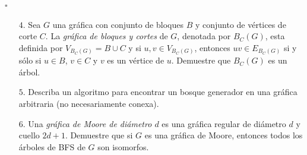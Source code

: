 \documentclass{article}
\begin{document}
\hfill $\square$
\begin{enumerate}
\item[$4$.] Sea $G$ una gr\'afica con conjunto de bloques $B$ y conjunto de
  v\'ertices de corte $C$.   La {\em gr\'afica de bloques y cortes} de $G$,
  denotada por $B_C (G)$, esta definida por $V_{B_C (G)} = B \cup C$ y
  si $u, v \in V_{B_C (G)}$, entonces $uv \in E_{B_C (G)}$ si y s\'olo si
  $u \in B$, $v \in C$ y $v$ es un v\'ertice de $u$.   Demuestre que
  $B_C (G)$ es un \'arbol.
  
\item[$5$.] Describa un algoritmo para encontrar un bosque generador en una
  gr\'afica arbitraria (no necesariamente conexa).
  
\item[$6$.] Una {\em gr\'afica de Moore de di\'ametro $d$} es una gr\'afica
  regular de di\'ametro $d$ y cuello $2d+1$.   Demuestre que si $G$ es
  una gr\'afica de Moore, entonces todos los \'arboles de BFS de $G$
  son isomorfos.

\end{enumerate}
\end{document}
